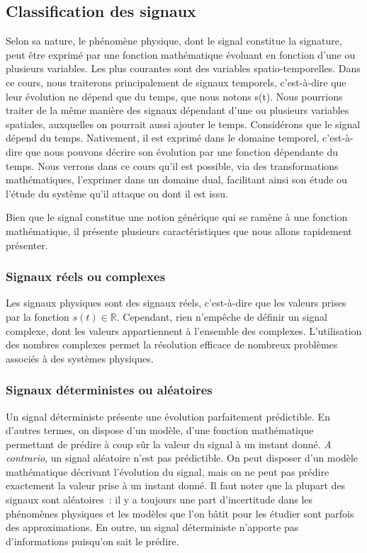 	
	
	
	
	\subsection{Classification des signaux}
	
	Selon sa nature, le phénomène physique, dont le signal constitue la
	signature, peut être exprimé par une fonction mathématique évoluant en
	fonction d'une ou plusieurs variables. Les plus courantes sont des
	variables spatio-temporelles. Dans ce cours, nous traiterons
	principalement de signaux temporels, c'est-à-dire que leur évolution ne
	dépend que du temps, que nous notons s(t). Nous pourrions traiter de la même manière des
	signaux dépendant d'une ou plusieurs variables spatiales, auxquelles on
	pourrait aussi ajouter le temps.
	Considérons que le signal dépend du temps. Nativement, il est exprimé
	dans le domaine temporel, c'est-à-dire que nous pouvons décrire son
	évolution par une fonction dépendante du temps. Nous verrons dans ce
	cours qu'il est possible, via des transformations mathématiques,
	l'exprimer dans un domaine dual, facilitant ainsi son étude ou l'étude
	du système qu'il attaque ou dont il est issu.
	
	Bien que le signal constitue une notion générique qui se ramène à une fonction mathématique, il présente plusieurs caractéristiques que nous allons rapidement présenter.
	
	\subsubsection{Signaux réels ou complexes}
	

	Les signaux physiques sont des signaux réels, c'est-à-dire que les valeurs prises par la fonction $s(t) \in \mathbb{R}$. Cependant, rien n'empêche de définir un signal complexe, dont les valeurs appartiennent à l'ensemble des complexes. L'utilisation des nombres complexes permet la résolution efficace de nombreux problèmes associés à des systèmes physiques. 
	
	\subsubsection{Signaux déterministes ou aléatoires}
	Un signal déterministe présente une évolution parfaitement prédictible. En d'autres termes, on dispose d'un modèle, d'une fonction mathématique permettant de prédire à coup sûr la valeur du signal à un instant donné. \emph{A contrario}, un signal aléatoire n'est pas prédictible. On peut disposer d'un modèle mathématique décrivant l'évolution du signal, mais on ne peut pas prédire exactement la valeur prise à un instant donné. Il faut noter que la plupart des signaux sont aléatoires~: il y a toujours une part d'incertitude dans les phénomènes physiques et les modèles que l'on bâtit pour les étudier sont parfois des approximations. En outre, un signal déterministe n'apporte pas d'informations puisqu'on sait le prédire. 
		
